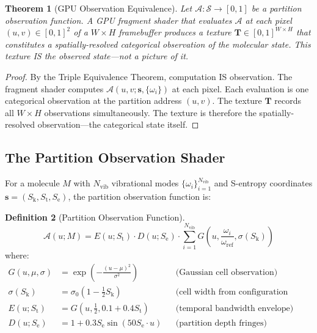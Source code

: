 \documentclass[11pt,twocolumn,a4paper]{article}
\newtheorem{theorem}{Theorem}[section]
\theoremstyle{definition}
\newtheorem{definition}[theorem]{Definition}
\theoremstyle{remark}
\newcommand{\Sk}{S_{\mathrm{k}}}
\newcommand{\St}{S_{\mathrm{t}}}
\newcommand{\Se}{S_{\mathrm{e}}}
\newcommand{\Sspace}{\mathcal{S}}
\newcommand{\Nvib}{N_{\mathrm{vib}}}
\begin{document}
\begin{theorem}[GPU Observation Equivalence]
\label{thm:gpu_observation}
Let $\mathcal{A}: \Sspace \to [0,1]$ be a partition observation function. A GPU fragment shader that evaluates $\mathcal{A}$ at each pixel $(u,v) \in [0,1]^2$ of a $W \times H$ framebuffer produces a texture $\mathbf{T} \in [0,1]^{W \times H}$ that constitutes a spatially-resolved categorical observation of the molecular state. This texture IS the observed state---not a picture of it.
\end{theorem}

\begin{proof}
By the Triple Equivalence Theorem, computation IS observation. The fragment shader computes $\mathcal{A}(u, v; \mathbf{s}, \{\omega_i\})$ at each pixel. Each evaluation is one categorical observation at the partition address $(u,v)$. The texture $\mathbf{T}$ records all $W \times H$ observations simultaneously. The texture is therefore the spatially-resolved observation---the categorical state itself.
\end{proof}

\subsection{The Partition Observation Shader}

For a molecule $M$ with $\Nvib$ vibrational modes $\{\omega_i\}_{i=1}^{\Nvib}$ and S-entropy coordinates $\mathbf{s} = (\Sk, \St, \Se)$, the partition observation function is:

\begin{definition}[Partition Observation Function]
\label{def:pof}
\begin{equation}
\mathcal{A}(u; M) = E(u; \St) \cdot D(u; \Se) \cdot \sum_{i=1}^{\Nvib} G\!\left(u, \frac{\omega_i}{\omega_{\mathrm{ref}}}, \sigma(\Sk)\right)
\label{eq:pof}
\end{equation}
where:
\begin{align}
G(u, \mu, \sigma) &= \exp\!\left(-\frac{(u - \mu)^2}{\sigma^2}\right) & &\text{(Gaussian cell observation)} \label{eq:gaussian_cell} \\
\sigma(\Sk) &= \sigma_0(1 - \tfrac{1}{2}\Sk) & &\text{(cell width from configuration entropy)} \label{eq:cell_width} \\
E(u; \St) &= G(u, \tfrac{1}{2}, 0.1 + 0.4\St) & &\text{(temporal bandwidth envelope)} \label{eq:envelope} \\
D(u; \Se) &= 1 + 0.3\Se \sin(50 \Se \cdot u) & &\text{(partition depth fringes)} \label{eq:depth}
\end{align}
\end{definition}
\end{document}
